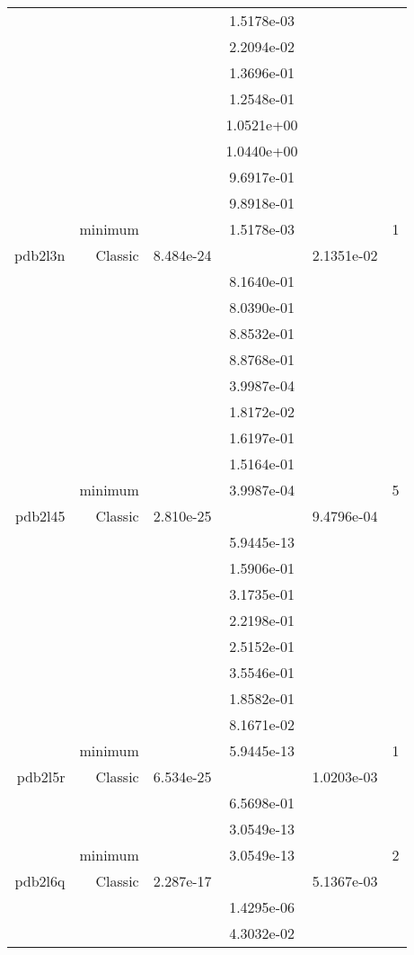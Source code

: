 \begin{xltabular}{\textwidth}{r|rS[table-format=1.3e+2]S[table-format=1.4e+2]S[table-format=1.4e+2]S[table-format=-1.5]}
&  &  & 1.5178e-03 & & \\
&  &  & 2.2094e-02 & & \\
&  &  & 1.3696e-01 & & \\
&  &  & 1.2548e-01 & & \\
&  &  & 1.0521e+00 & & \\
&  &  & 1.0440e+00 & & \\
&  &  & 9.6917e-01 & & \\
&  &  & 9.8918e-01 & & \\
& minimum &  & 1.5178e-03 & & 1 \\  \addlinespace
pdb2l3n & Classic & 8.484e-24 &  & 2.1351e-02 & \\
&  &  & 8.1640e-01 & & \\
&  &  & 8.0390e-01 & & \\
&  &  & 8.8532e-01 & & \\
&  &  & 8.8768e-01 & & \\
&  &  & 3.9987e-04 & & \\
&  &  & 1.8172e-02 & & \\
&  &  & 1.6197e-01 & & \\
&  &  & 1.5164e-01 & & \\
& minimum &  & 3.9987e-04 & & 5 \\  \addlinespace
pdb2l45 & Classic & 2.810e-25 &  & 9.4796e-04 & \\
&  &  & 5.9445e-13 & & \\
&  &  & 1.5906e-01 & & \\
&  &  & 3.1735e-01 & & \\
&  &  & 2.2198e-01 & & \\
&  &  & 2.5152e-01 & & \\
&  &  & 3.5546e-01 & & \\
&  &  & 1.8582e-01 & & \\
&  &  & 8.1671e-02 & & \\
& minimum &  & 5.9445e-13 & & 1 \\  \addlinespace
pdb2l5r & Classic & 6.534e-25 &  & 1.0203e-03 & \\
&  &  & 6.5698e-01 & & \\
&  &  & 3.0549e-13 & & \\
& minimum &  & 3.0549e-13 & & 2 \\  \addlinespace
pdb2l6q & Classic & 2.287e-17 &  & 5.1367e-03 & \\
&  &  & 1.4295e-06 & & \\
&  &  & 4.3032e-02 & & \\

\end{xltabular}
